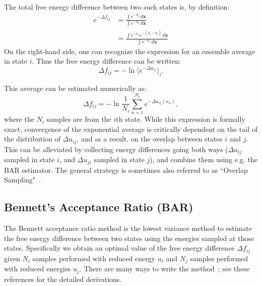 \documentclass[9pt,review]{livecoms}
\newcommand{\vx}{\mathbf{x}}
\begin{document}
The total free energy difference between two such states is, by definition:
\begin{align}
    e^{-\Delta f_{ij}} &=  \frac{\int e^{-u_j} \, d\vx}{\int e^{-u_i} \, d\vx}\\
    &= \frac{\int e^{-u_i}  e^{-(u_j-u_i)} \, d\vx}{\int e^{-u_i} \, d\vx}
\end{align}
On the right-hand side, one can recognize the expression for an ensemble average in state $i$.
Thus the free energy difference can be written:
\begin{equation}
    \Delta f_{ij} = -\ln \langle e^{-\Delta u_{ij}}\rangle_i.
\end{equation}

This average can be estimated numerically as:
\begin{equation}
\Delta f_{ij} = -\ln \frac{1}{N_i}\sum_{n=1}^{N_i} e^{-\Delta u_{ij}(x_n)},
\end{equation}
where the $N_i$ samples are from the $i$th state.
While this expression is formally exact, convergence of the exponential average is critically dependent on the tail of the distribution of $\Delta u_{ij}$, and as a result, on the overlap between states $i$ and $j$.
This can be alleviated by collecting energy differences going both ways ($\Delta u_{ij}$ sampled in state $i$, and $\Delta u_{ji}$ sampled in state $j$), and combine them using e.g. the BAR estimator.
The general strategy is sometimes also referred to as ``Overlap Sampling"~\cite{Lu2003}.

\subsection{Bennett's Acceptance Ratio (BAR)}

The Bennett acceptance ratio method is the lowest variance method to estimate the free energy difference between two states using the energies sampled at those states. Specifically we
obtain an optimal value of the free energy difference $\Delta f_{ij}$ given $N_i$ samples performed with reduced energy $u_i$ and $N_j$ samples performed with reduced energies $u_j$. There are many ways to write
the method~\cite{bennett:jcp:1976:fe-estimate,shirts_comparison_2005,fenwick-escobedo:jcp:2003:replica-exchange-expanded-ensembles}; see these references for the detailed derivations.
\end{document}
